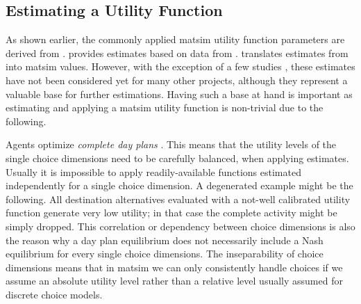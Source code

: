 

\subsection{Estimating a Utility Function}
\label{sec:estimation}
As shown earlier, the commonly applied \gls{matsim} utility function parameters are derived from \citet[][]{ArnottEtAl_TAER_1993, ChaumetEtAl_2006}. \citet[][]{Kickhoefer_MastersThesis_2009} provides estimates based on data from \citet[][]{VrticEtc2008ReisekostenSVIBericht}. \citet[][]{KickhoeferEtAl2012WelfareBusCorridorKuhmoNectar} translates estimates from \citet[][]{TirachiniEtAl2012CrowdingCongestion} into \gls{matsim} values.
%
However, with the exception of a few studies \citet[][]{BalmerEtAl_ResRep_datapuls_2010, HuelsmannEtAl2012HotspotPricing, KickhoeferNagel2013EmissionInternalizationNETS, KaddouraEtAl2014AgentBasedPtOptimization, KaddouraEtAl2015PtMarginalSocialCostPricingJTEP}, these estimates have not been considered yet for many other projects, although they represent a valuable base for further estimations. Having such a base at hand is important as estimating and applying a \gls{matsim} utility function is non-trivial due to the following. 

Agents optimize \emph{complete day plans} \citep[see also][Section 6.3.1]{MATSim_Userguide_2015}. This means that the utility levels of the single choice dimensions need to be carefully balanced, when applying estimates. Usually it is impossible to apply readily-available functions estimated independently for a single choice dimension. A degenerated example might be the following. All destination alternatives evaluated with a not-well calibrated utility function generate very low utility; in that case the complete activity might be simply dropped. 
%
%
%
This correlation or dependency between choice dimensions is also the reason why a day plan equilibrium does not necessarily include a Nash equilibrium for every single choice dimensions. The inseparability of choice dimensions means that in \gls{matsim} we can only consistently handle choices if we assume an absolute utility level rather than a relative level usually assumed for discrete choice models.
%

